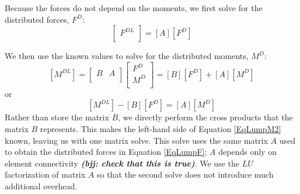 \documentclass[10pt,letterpaper,oneside,notitlepage]{article}
\begin{document}
Because the forces do not depend on the moments, we first solve for the distributed forces, $F^D$:
\begin{equation}
\label{EqLumpF}
	\begin{bmatrix}	F^{DL} \\	\end{bmatrix}
=
	\left[		A    \right]
	\left[	F^{D}  \right]
\end{equation}

We then use the known values to solve for the distributed moments, $M^D$:
\begin{equation}
\label{EqLumpM1}
	\left[	M^{DL} \right]
=
	\begin{bmatrix} B & A \\	\end{bmatrix}
	\begin{bmatrix}
	F^{D} \\
	M^{D} \\
	\end{bmatrix}
= \left[	B \right] \left[	F^D \right] + \left[	A \right] \left[	M^D \right] 
\end{equation}
or
\begin{equation}
\label{EqLumpM2}
\left[	M^{DL} \right] - \left[	B \right] \left[	F^D \right] = \left[	A \right] \left[	M^D \right]
\end{equation}
Rather than store the matrix $B$, we directly perform the cross products that the matrix $B$ represents.
This makes the left-hand side of Equation \ref{EqLumpM2} known, leaving us with one matrix solve. This 
solve uses the same matrix $A$ used to obtain the distributed forces in Equation \ref{EqLumpF}; $A$ depends 
only on element connectivity \textbf{\textit{(bjj: check that this is true)}}. We use 
the $LU$ factorization of matrix $A$ so that the second solve does not introduce much additional overhead.
\end{document}
